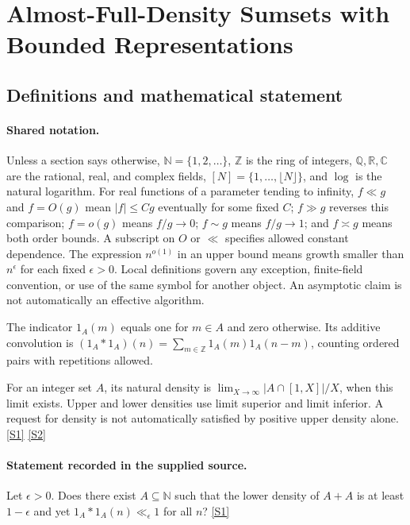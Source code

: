 \documentclass[11pt,a4paper]{article}
\newcommand{\N}{\mathbb{N}}
\newcommand{\Z}{\mathbb{Z}}
\newcommand{\Q}{\mathbb{Q}}
\newcommand{\R}{\mathbb{R}}
\newcommand{\C}{\mathbb{C}}
\newcommand{\sref}[2]{\hyperlink{source:#1:#2}{[S#2]}}
\begin{document}
\section{Almost-Full-Density Sumsets with Bounded Representations}\label{statement}


\subsection{Definitions and mathematical statement}

\paragraph{Shared notation.}Unless a section says otherwise, $\N=\{1,2,\ldots\}$,
$\Z$ is the ring of integers, $\Q,\R,\C$ are the rational, real, and complex
fields, $[N]=\{1,\ldots,\lfloor N\rfloor\}$, and $\log$ is the natural
logarithm. For real functions of a parameter tending to infinity,
$f\ll g$ and $f=O(g)$ mean $|f|\leq Cg$ eventually for some fixed $C$;
$f\gg g$ reverses this comparison; $f=o(g)$ means $f/g\to0$;
$f\sim g$ means $f/g\to1$; and $f\asymp g$ means both order bounds.
A subscript on $O$ or $\ll$ specifies allowed constant dependence.
The expression $n^{o(1)}$ in an upper bound means growth smaller than
$n^\epsilon$ for each fixed $\epsilon>0$. Local definitions govern any
exception, finite-field convention, or use of the same symbol for another
object. An asymptotic claim is not automatically an effective algorithm.



The indicator $1_A(m)$ equals one for $m\in A$ and zero otherwise. Its additive convolution is $(1_A*1_A)(n)=\sum_{m\in\Z}1_A(m)1_A(n-m)$, counting ordered pairs with repetitions allowed.

For an integer set $A$, its natural density is $\lim_{X\to\infty}|A\cap[1,X]|/X$, when this limit exists. Upper and lower densities use limit superior and limit inferior. A request for density is not automatically satisfied by positive upper density alone. \sref{statement}{1} \sref{statement}{2}

\paragraph{Statement recorded in the supplied source.}
Let $\epsilon>0$. Does there exist $A\subseteq \mathbb{N}$ such that the lower density of $A+A$ is at least $1-\epsilon$ and yet $1_A\ast 1_A(n) \ll_\epsilon 1$ for all $n$? \sref{statement}{1}
\end{document}
